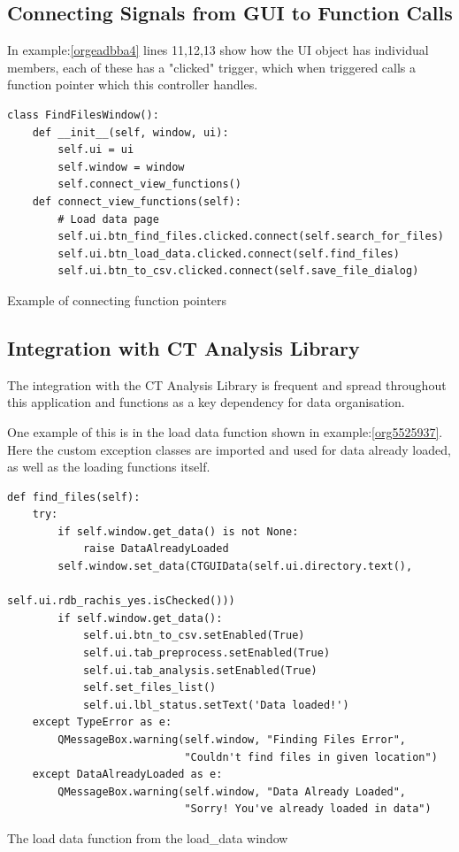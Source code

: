 \documentclass[11pt]{report}
\begin{document}
\subsection{Connecting Signals from GUI to Function Calls}
\label{sec:org205fe08}
In example:\ref{orgeadbba4} lines 11,12,13 show how the UI object has individual members, each of these has a "clicked" trigger, which when triggered calls a function pointer which this controller handles.
\begin{listing}[htbp]
\begin{verbatim}
class FindFilesWindow():
    def __init__(self, window, ui):
        self.ui = ui
        self.window = window
        self.connect_view_functions()
    def connect_view_functions(self):
        # Load data page
        self.ui.btn_find_files.clicked.connect(self.search_for_files)
        self.ui.btn_load_data.clicked.connect(self.find_files)
        self.ui.btn_to_csv.clicked.connect(self.save_file_dialog)
\end{verbatim}
\caption{\label{orgeadbba4}
Example of connecting function pointers}
\end{listing}

\subsection{Integration with CT Analysis Library}
\label{sec:org1ab83ff}

The integration with the CT Analysis Library is frequent and spread throughout this application and functions as a key dependency for data organisation.

One example of this is in the load data function shown in example:\ref{org5525937}. Here the custom exception classes are imported and used for data already loaded, as well as the loading functions itself.

\begin{listing}[htbp]
\begin{verbatim}
def find_files(self):
    try:
        if self.window.get_data() is not None:
            raise DataAlreadyLoaded
        self.window.set_data(CTGUIData(self.ui.directory.text(),
                                       self.ui.rdb_rachis_yes.isChecked()))
        if self.window.get_data():
            self.ui.btn_to_csv.setEnabled(True)
            self.ui.tab_preprocess.setEnabled(True)
            self.ui.tab_analysis.setEnabled(True)
            self.set_files_list()
            self.ui.lbl_status.setText('Data loaded!')
    except TypeError as e:
        QMessageBox.warning(self.window, "Finding Files Error",
                            "Couldn't find files in given location")
    except DataAlreadyLoaded as e:
        QMessageBox.warning(self.window, "Data Already Loaded",
                            "Sorry! You've already loaded in data")
\end{verbatim}
\caption{\label{org5525937}
The load data function from the load\_data window}
\end{listing}
\end{document}
